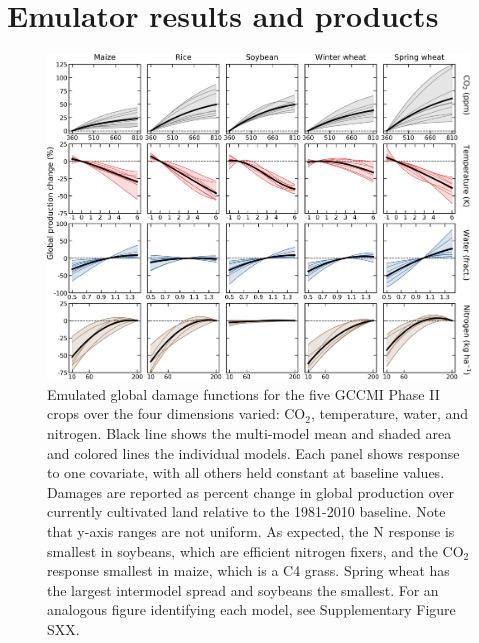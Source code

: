 \documentclass[gmd, manuscript]{copernicus} %
\begin{document}
\section{Emulator results and products}
\label{S:5}
\begin{figure}[ht]
  \centering
  \includegraphics[width = 16.3cm]{figures/em_CTWN_all_crops.png}
  \caption{
  Emulated global damage functions for the five GCCMI Phase II crops over the four dimensions varied: CO$_2$, temperature, water, and nitrogen.
  Black line shows the multi-model mean and shaded area and colored lines the individual models. 
 Each panel shows response to one covariate, with all others held constant at baseline values. %
  Damages are reported as percent change in global production over currently cultivated land relative to the 1981-2010 baseline. Note that y-axis ranges are not uniform.
	As expected, the N response is smallest in soybeans, which are efficient nitrogen fixers, and the CO$_2$ response smallest in maize, which is a C4 grass. Spring wheat has the largest intermodel spread and soybeans the smallest. For an analogous figure identifying each model, see Supplementary Figure SXX.
  }
  \label{fig:all_dims}
\end{figure}
\end{document}
